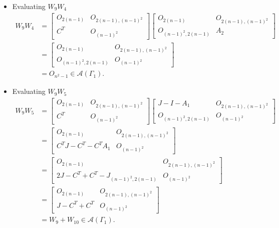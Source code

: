 \begin{itemize}
    \item Evaluating $W_9W_4$
    \begin{align*}
        W_9W_4
        &=\begin{bmatrix}
            O_{2(n-1)} & O_{2(n-1), (n-1)^2} \\
            C^T & O_{(n-1)^2}
        \end{bmatrix}\begin{bmatrix}
            O_{2(n-1)} & O_{2(n-1), (n-1)^2} \\
            O_{(n-1)^2, 2(n-1)} & A_2
        \end{bmatrix} \\
        &= \begin{bmatrix}
            O_{2(n-1)} & O_{2(n-1), (n-1)^2} \\
            O_{(n-1)^2, 2(n-1)} & O_{(n-1)^2}
        \end{bmatrix}\\
        &= O_{n^2-1}\in\mathcal{A}(\Gamma_1).
    \end{align*}
    
    \item Evaluating $W_9W_5$
    \begin{align*}
        W_9W_5
        &=\begin{bmatrix}
            O_{2(n-1)} & O_{2(n-1), (n-1)^2} \\
            C^T & O_{(n-1)^2}
        \end{bmatrix}\begin{bmatrix}
            J-I-A_1 & O_{2(n-1), (n-1)^2} \\
            O_{(n-1)^2, 2(n-1)} & O_{(n-1)^2}
        \end{bmatrix} \\
        &= \begin{bmatrix}
            O_{2(n-1)} & O_{2(n-1), (n-1)^2} \\
            C^TJ-C^T-C^TA_1 & O_{(n-1)^2}
        \end{bmatrix}\\
        &= \begin{bmatrix}
            O_{2(n-1)} & O_{2(n-1), (n-1)^2} \\
            2J-C^T+C^T - J_{(n-1)^2, 2(n-1)} & O_{(n-1)^2}
        \end{bmatrix}\\
        &= \begin{bmatrix}
            O_{2(n-1)} & O_{2(n-1), (n-1)^2} \\
            J-C^T + C^T& O_{(n-1)^2}
        \end{bmatrix}\\
        &= W_9 + W_{10}\in\mathcal{A}(\Gamma_1).
    \end{align*}
    

\end{itemize}
